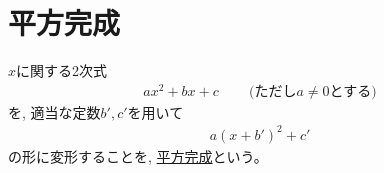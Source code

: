 \section{平方完成}

$x$に関する2次式
\begin{eqnarray}
ax^2+bx+c\,\,\,\,\,\,\,\,\,\,\,\,\,\text{(ただし}a\ne0\text{とする)}
\end{eqnarray}
を, 適当な定数$b', c'$を用いて
\begin{eqnarray}a(x+b')^2+c'\label{eq:heihokansei0}\end{eqnarray}
の形に変形することを, \underline{平方完成}という。

